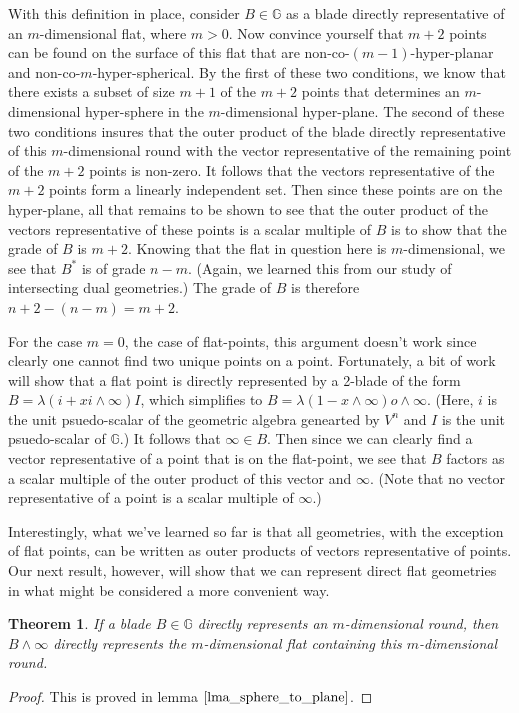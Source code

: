 \documentclass[12pt]{article}
\newcommand{\G}{\mathbb{G}}
\newcommand{\nvao}{o}
\newcommand{\nvai}{\infty}
\newtheorem{theorem}{Theorem}[section]
\begin{document}
With this definition in place, consider $B\in\G$ as a blade directly representative
of an $m$-dimensional flat, where $m>0$.  Now convince yourself that $m+2$ points can
be found on the surface of this flat that are non-co-$(m-1)$-hyper-planar
and non-co-$m$-hyper-spherical.  By the first of these two conditions,
we know that there exists a subset of size $m+1$ of the $m+2$ points that
determines an $m$-dimensional hyper-sphere in the $m$-dimensional hyper-plane.
The second of these two conditions insures that the outer product
of the blade directly representative of this $m$-dimensional round
with the vector representative of the remaining point of the $m+2$
points is non-zero.  It follows that the vectors representative
of the $m+2$ points form a linearly independent set.  Then since
these points are on the hyper-plane, all that remains to be shown
to see that the outer product of the vectors representative of these
points is a scalar multiple of $B$ is to show that the grade of $B$ is $m+2$.
Knowing that the flat in question here is $m$-dimensional, we see that $B^*$
is of grade $n-m$.  (Again, we learned this from our study of intersecting
dual geometries.)  The grade of $B$ is therefore $n+2-(n-m)=m+2$.

For the case $m=0$, the case of flat-points, this argument doesn't work since clearly
one cannot find two unique points on a point.  Fortunately, a bit of work will show
that a flat point is directly represented by a 2-blade of the form $B=\lambda(i+xi\wedge\nvai)I$,
which simplifies to $B=\lambda(1-x\wedge\nvai)\nvao\wedge\nvai$.  (Here, $i$ is
the unit psuedo-scalar of the geometric algebra genearted by $V^n$ and $I$ is
the unit psuedo-scalar of $\G$.)  It follows that
$\nvai\in B$.  Then since we can clearly find a vector representative of a point
that is on the flat-point, we see that $B$ factors as a scalar multiple of the outer
product of this vector and $\nvai$.  (Note that no vector representative of a point
is a scalar multiple of $\nvai$.)

Interestingly, what we've learned so far is that all geometries,
with the exception of flat points, can be written as outer products
of vectors representative of points.  Our next result, however, will
show that we can represent direct flat geometries in what might be
considered a more convenient way.
\begin{theorem}\label{thm_round_to_flat}
If a blade $B\in\G$ directly represents an $m$-dimensional round,
then $B\wedge\nvai$ directly represents the $m$-dimensional flat
containing this $m$-dimensional round.
\end{theorem}
\begin{proof}
This is proved in lemma $\eqref{lma_sphere_to_plane}$.
\end{proof}
\end{document}
